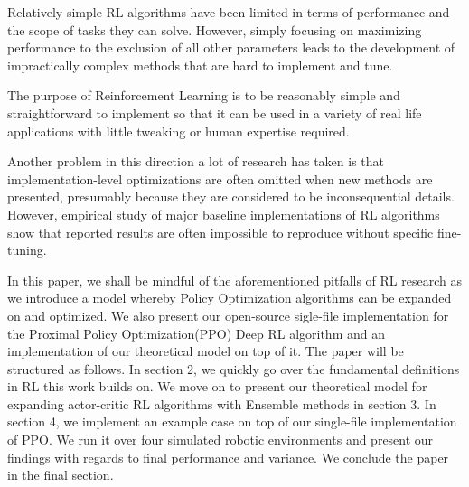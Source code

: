 Relatively simple RL algorithms have been limited in terms of performance and the scope of tasks they can solve. However, simply focusing on maximizing performance to the exclusion of all other parameters leads to the development of impractically complex methods that are hard to implement and tune.%

The purpose of Reinforcement Learning is to be reasonably simple and straightforward to implement so that it can be used in a variety of real life applications with little tweaking or human expertise required.

Another problem in this direction a lot of research has taken is that implementation-level optimizations are often omitted when new methods are presented, presumably because they are considered to be inconsequential details. However, empirical study of  major baseline implementations of RL algorithms show that reported results are often impossible to reproduce without specific fine-tuning\cite{henderson2018deep}\cite{islam2017reproducibility}\cite{andrychowicz2021matters}\cite{dossa2021empirical}.


In this paper, we shall be mindful of the aforementioned pitfalls of RL research as we introduce a model whereby Policy Optimization algorithms can be expanded on and optimized. We also present our open-source sigle-file implementation for the Proximal Policy Optimization\cite{schulman2017proximal}(PPO) Deep RL algorithm and an implementation of our theoretical model on top of it. The paper will be structured as follows. In section 2, we quickly go over the fundamental definitions in RL this work builds on. We move on to present our theoretical model for expanding actor-critic RL algorithms with Ensemble methods in section 3. In section 4, we implement an example case on top of our single-file implementation of PPO. We run it over four simulated robotic environments and present our findings with regards to final performance and variance. We conclude the paper in the final section.
